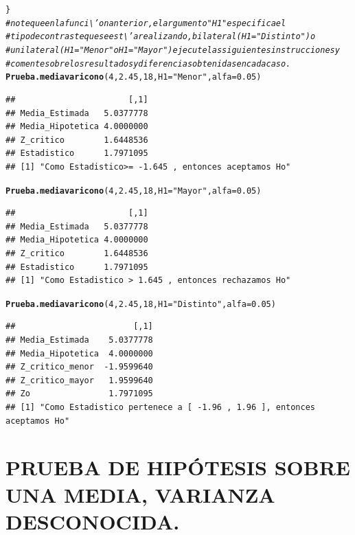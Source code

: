 \documentclass[12pt,letterpaper]{article}\usepackage[]{graphicx}\usepackage[]{color}
\makeatletter
\newcommand{\hlnum}[1]{\textcolor[rgb]{0.686,0.059,0.569}{#1}}%
\newcommand{\hlstr}[1]{\textcolor[rgb]{0.192,0.494,0.8}{#1}}%
\newcommand{\hlcom}[1]{\textcolor[rgb]{0.678,0.584,0.686}{\textit{#1}}}%
\newcommand{\hlstd}[1]{\textcolor[rgb]{0.345,0.345,0.345}{#1}}%
\newcommand{\hlkwc}[1]{\textcolor[rgb]{0.333,0.667,0.333}{#1}}%
\newcommand{\hlkwd}[1]{\textcolor[rgb]{0.737,0.353,0.396}{\textbf{#1}}}%
\newenvironment{kframe}{%
 \def\at@end@of@kframe{}%
 \ifinner\ifhmode%
  \def\at@end@of@kframe{\end{minipage}}%
  \begin{minipage}{\columnwidth}%
 \fi\fi%
 \def\FrameCommand##1{\hskip\@totalleftmargin \hskip-\fboxsep
 \colorbox{shadecolor}{##1}\hskip-\fboxsep
     \hskip-\linewidth \hskip-\@totalleftmargin \hskip\columnwidth}%
 \MakeFramed {\advance\hsize-\width
   \@totalleftmargin\z@ \linewidth\hsize
   \@setminipage}}%
 {\par\unskip\endMakeFramed%
 \at@end@of@kframe}
\newenvironment{knitrout}{}{} %
\makeatother
\begin{document}
\begin{knitrout}
\begin{kframe}
\begin{alltt}
\hlstd{\}}
\hlcom{# note que en la funci\textbackslash{}'on anterior, el argumento "H1" especifica el }
\hlcom{# tipo de contraste que se est\textbackslash{}'a realizando, bilateral (H1= "Distinto") o }
\hlcom{# unilateral (H1= "Menor" o H1= "Mayor") ejecute las siguientes instrucciones y }
\hlcom{# comente sobre los resultados y diferencias obtenidas en cada caso. }
\hlkwd{Prueba.mediavaricono} \hlstd{(}\hlnum{4}\hlstd{,} \hlnum{2.45}\hlstd{,} \hlnum{18}\hlstd{,} \hlkwc{H1}\hlstd{=}\hlstr{"Menor"}\hlstd{,} \hlkwc{alfa}\hlstd{=}\hlnum{0.05}\hlstd{)}
\end{alltt}
\begin{verbatim}
##                       [,1]
## Media_Estimada   5.0377778
## Media_Hipotetica 4.0000000
## Z_critico        1.6448536
## Estadistico      1.7971095
## [1] "Como Estadistico>= -1.645 , entonces aceptamos Ho"
\end{verbatim}
\begin{alltt}
\hlkwd{Prueba.mediavaricono} \hlstd{(}\hlnum{4}\hlstd{,} \hlnum{2.45}\hlstd{,} \hlnum{18}\hlstd{,} \hlkwc{H1}\hlstd{=}\hlstr{"Mayor"}\hlstd{,} \hlkwc{alfa}\hlstd{=}\hlnum{0.05}\hlstd{)}
\end{alltt}
\begin{verbatim}
##                       [,1]
## Media_Estimada   5.0377778
## Media_Hipotetica 4.0000000
## Z_critico        1.6448536
## Estadistico      1.7971095
## [1] "Como Estadistico > 1.645 , entonces rechazamos Ho"
\end{verbatim}
\begin{alltt}
\hlkwd{Prueba.mediavaricono} \hlstd{(}\hlnum{4}\hlstd{,} \hlnum{2.45}\hlstd{,} \hlnum{18}\hlstd{,} \hlkwc{H1}\hlstd{=}\hlstr{"Distinto"}\hlstd{,} \hlkwc{alfa}\hlstd{=}\hlnum{0.05}\hlstd{)}
\end{alltt}
\begin{verbatim}
##                        [,1]
## Media_Estimada    5.0377778
## Media_Hipotetica  4.0000000
## Z_critico_menor  -1.9599640
## Z_critico_mayor   1.9599640
## Zo                1.7971095
## [1] "Como Estadistico pertenece a [ -1.96 , 1.96 ], entonces aceptamos Ho"
\end{verbatim}
\end{kframe}
\end{knitrout}



\section{PRUEBA DE HIP\'OTESIS SOBRE UNA MEDIA, VARIANZA DESCONOCIDA.}
\end{document}

